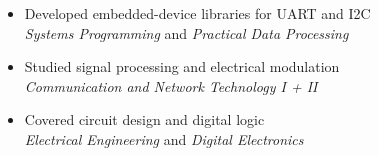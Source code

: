 {{    \begin{itemize}[left=0mm]
      \item Developed embedded-device libraries for UART and I2C\\\textit{Systems Programming} and \textit{Practical Data Processing}
      \item Studied signal processing and electrical modulation\\\textit{Communication and Network Technology I + II}
      \item Covered circuit design and digital logic\\\textit{Electrical Engineering} and \textit{Digital Electronics}
    \end{itemize}
    \vspace{3mm}
}
}


\newcommand{\CVWork}{
\CVEntry{2020/7 -- 2025/3}{Atix AG}{
}%
\vspace{-2.5mm}
\CVSubEntryLocation{2024/10 -- 2025/3}{Munich}{
    \textbf{Software Developer}
    {
      \begin{itemize}[left=0mm]
        \item Gained experience in management roles as Release Coordinator and worked in an agile team using Kanban
        \item Maintenance of existing Foreman plugins, improved code stability, and focused on the package build process
      \end{itemize}
      \vspace{1mm}
    }%
}
\CVSubEntryLocation{2020/7 -- 2024/9}{Munich}{
    \textbf{Working Student}
    {
      \begin{itemize}[left=0mm]
        \item Improved the Foreman Salt Plugin by implementing a secret-key authentication procedure (\href{https://youtu.be/qFa0uGq1X7U?t=0}{video})

\end{itemize}}}}
